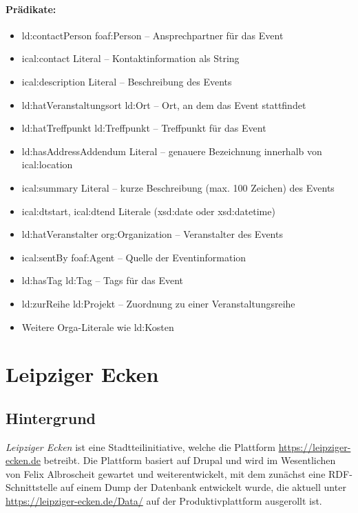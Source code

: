 \documentclass[a4paper,11pt]{article}
\begin{document}
\paragraph{Prädikate:}
\begin{itemize}\itemsep0pt
\item ld:contactPerson foaf:Person – Ansprechpartner für das Event
\item ical:contact Literal – Kontaktinformation als String
\item ical:description Literal – Beschreibung des Events
\item ld:hatVeranstaltungsort ld:Ort – Ort, an dem das Event stattfindet
\item ld:hatTreffpunkt ld:Treffpunkt – Treffpunkt für das Event
\item ld:hasAddressAddendum Literal – genauere Bezeichnung innerhalb von
  ical:location
\item ical:summary Literal – kurze Beschreibung (max. 100 Zeichen) des Events
\item ical:dtstart, ical:dtend Literale (xsd:date oder xsd:datetime)
\item ld:hatVeranstalter org:Organization – Veranstalter des Events
\item ical:sentBy foaf:Agent – Quelle der Eventinformation
\item ld:hasTag ld:Tag – Tags für das Event
\item ld:zurReihe ld:Projekt – Zuordnung zu einer Veranstaltungsreihe
\item Weitere Orga-Literale wie ld:Kosten
\end{itemize}
\newpage

\section{Leipziger Ecken}

\subsection{Hintergrund}

\emph{Leipziger Ecken} ist eine Stadtteilinitiative, welche die Plattform
\url{https://leipziger-ecken.de} betreibt. Die Plattform basiert auf Drupal
und wird im Wesentlichen von Felix Albroscheit gewartet und weiterentwickelt,
mit dem zunächst eine RDF-Schnittstelle auf einem Dump der Datenbank
entwickelt wurde, die aktuell unter \url{https://leipziger-ecken.de/Data/} auf
der Produktivplattform ausgerollt ist. 
\end{document}
